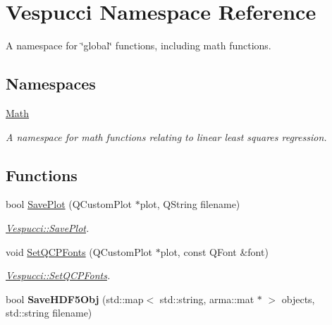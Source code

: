 \hypertarget{namespace_vespucci}{\section{Vespucci Namespace Reference}
\label{namespace_vespucci}
}


A namespace for \char`\"{}global\char`\"{} functions, including math functions.  


\subsection*{Namespaces}
\begin{DoxyCompactItemize}
\item 
 \hyperlink{namespace_vespucci_1_1_math}{Math}
\begin{DoxyCompactList}\small\item\em A namespace for math functions relating to linear least squares regression. \end{DoxyCompactList}\end{DoxyCompactItemize}
\subsection*{Functions}
\begin{DoxyCompactItemize}
\item 
bool \hyperlink{namespace_vespucci_ac9e75378ca4f326d27765420a5fe0017}{Save\+Plot} (Q\+Custom\+Plot $\ast$plot, Q\+String filename)
\begin{DoxyCompactList}\small\item\em \hyperlink{namespace_vespucci_ac9e75378ca4f326d27765420a5fe0017}{Vespucci\+::\+Save\+Plot}. \end{DoxyCompactList}\item 
void \hyperlink{namespace_vespucci_aa3b7c327a9c8fefe9f90b596b0522769}{Set\+Q\+C\+P\+Fonts} (Q\+Custom\+Plot $\ast$plot, const Q\+Font \&font)
\begin{DoxyCompactList}\small\item\em \hyperlink{namespace_vespucci_aa3b7c327a9c8fefe9f90b596b0522769}{Vespucci\+::\+Set\+Q\+C\+P\+Fonts}. \end{DoxyCompactList}\item 
\hypertarget{namespace_vespucci_a5ebee09a87fe265d7270a8e0661313c4}{bool {\bfseries Save\+H\+D\+F5\+Obj} (std\+::map$<$ std\+::string, arma\+::mat $\ast$ $>$ objects, std\+::string filename)}\label{namespace_vespucci_a5ebee09a87fe265d7270a8e0661313c4}

\end{DoxyCompactItemize}


